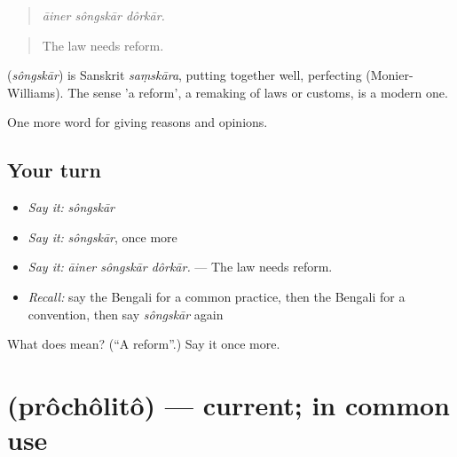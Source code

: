 \begin{quote}
  
\end{quote}

\begin{quote}
\emph{āiner sôngskār dôrkār.}
\end{quote}

\begin{quote}
The law needs reform.
\end{quote}

\begin{cousinweb}
\textbf{} (\emph{sôngskār}) is Sanskrit \emph{saṃskāra}, putting together well, perfecting (Monier-Williams). The sense 'a reform', a remaking of laws or customs, is a modern one.
\end{cousinweb}

\begin{grammarlens}[title={What you've built}]
One more word for giving reasons and opinions.
\end{grammarlens}

\subsection*{Your turn}
\begin{itemize}
\raggedright
  \item \emph{Say it:} \emph{sôngskār}
  \item \emph{Say it:} \emph{sôngskār}, once more
  \item \emph{Say it:} \emph{āiner sôngskār dôrkār.} — The law needs reform.
  \item \emph{Recall:} say the Bengali for a common practice, then the Bengali for a convention, then say \emph{sôngskār} again
\end{itemize}

\begin{tcolorbox}[breakable,colback=teal!4,colframe=teal!35!black,title={Before you move on}]
What does  mean? (\textquotedblleft{}A reform\textquotedblright{}.) Say it once more.
\end{tcolorbox}
\section[\texorpdfstring{\bn{প্রচলিত} (prôchôlitô)}{প্রচলিত (prôchôlitô)}]{ (prôchôlitô) — current; in common use}

\label{lesson:BN-C353-procholito}



